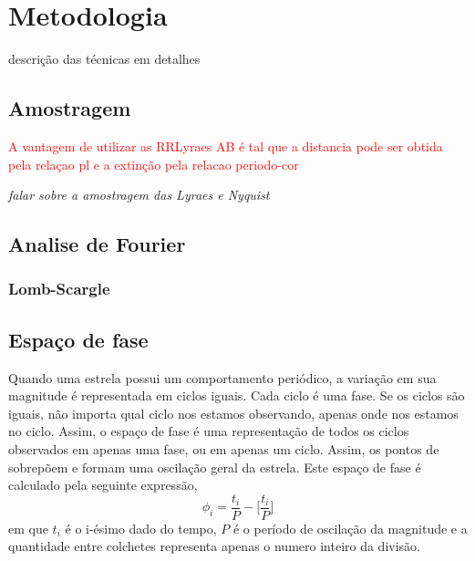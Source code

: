 \chapter{Metodologia}
\label{cap:tecnicas}
descrição das técnicas em detalhes

\section{Amostragem}

\textcolor{red}{A vantagem de utilizar as RRLyraes AB é tal que a distancia pode ser obtida pela relaçao pl e a extinção pela relacao periodo-cor \citep{Pejcha2009}}

\textit{falar sobre a amostragem das Lyraes e Nyquist}

\section{Analise de Fourier}

\subsection{Lomb-Scargle}

\section{Espaço de fase}

Quando uma estrela possui um comportamento periódico, a variação em sua magnitude é representada em ciclos iguais. Cada ciclo é uma fase. Se os ciclos são iguais, não importa qual ciclo nos estamos observando, apenas onde nos estamos no ciclo. Assim, o espaço de fase é uma representação de todos os ciclos observados em apenas uma fase, ou em apenas um ciclo. Assim, os pontos de sobrepõem e formam uma oscilação geral da estrela. Este espaço de fase é calculado pela seguinte expressão,
\begin{equation}
\phi_i = \frac{t_i}{P} - \Big[\frac{t_i}{P}\Big]
\end{equation}
em que $t_i$ é o i-ésimo dado do tempo, $P$ é o período de oscilação da magnitude e a quantidade entre colchetes representa apenas o numero inteiro da divisão. 




